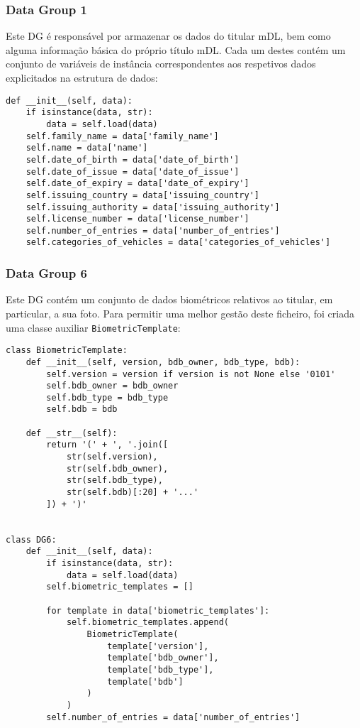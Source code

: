 \subsubsection{Data Group 1}

Este DG é responsável por armazenar os dados do titular mDL, bem como alguma informação básica do próprio título mDL. Cada um destes contém um conjunto de variáveis de instância correspondentes aos respetivos dados explicitados na estrutura de dados:

\begin{Verbatim}[frame=single, framerule=0.5mm]
def __init__(self, data):
    if isinstance(data, str):
        data = self.load(data)
    self.family_name = data['family_name']
    self.name = data['name']
    self.date_of_birth = data['date_of_birth']
    self.date_of_issue = data['date_of_issue']
    self.date_of_expiry = data['date_of_expiry']
    self.issuing_country = data['issuing_country']
    self.issuing_authority = data['issuing_authority']
    self.license_number = data['license_number']
    self.number_of_entries = data['number_of_entries']
    self.categories_of_vehicles = data['categories_of_vehicles']
\end{Verbatim}

\subsubsection{Data Group 6}

Este DG contém um conjunto de dados biométricos relativos ao titular, em particular, a sua foto. Para permitir uma melhor gestão deste ficheiro, foi criada uma classe auxiliar \texttt{BiometricTemplate}:

\begin{Verbatim}[frame=single, framerule=0.5mm]
class BiometricTemplate:
    def __init__(self, version, bdb_owner, bdb_type, bdb):
        self.version = version if version is not None else '0101'
        self.bdb_owner = bdb_owner
        self.bdb_type = bdb_type
        self.bdb = bdb
    
    def __str__(self):
        return '(' + ', '.join([
            str(self.version),
            str(self.bdb_owner),
            str(self.bdb_type),
            str(self.bdb)[:20] + '...'
        ]) + ')'


class DG6:
    def __init__(self, data):
        if isinstance(data, str):
            data = self.load(data)
        self.biometric_templates = []
        
        for template in data['biometric_templates']:
            self.biometric_templates.append(
                BiometricTemplate(
                    template['version'],
                    template['bdb_owner'],
                    template['bdb_type'],
                    template['bdb']
                )
            )
        self.number_of_entries = data['number_of_entries']
\end{Verbatim}

